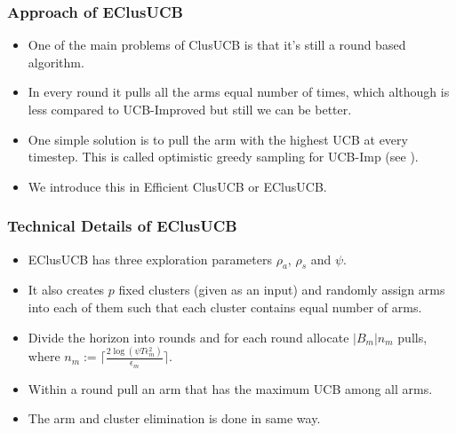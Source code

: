 \begin{frame}
\frametitle{Approach of EClusUCB}
\begin{itemize}
\item<1-> One of the main problems of ClusUCB is that it's still a round based algorithm.
\item<2-> In every round it pulls all the arms equal number of times, which although is less compared to UCB-Improved but still we can be better.
\item<3-> One simple solution is to pull the arm with the highest UCB at every timestep. This is called optimistic greedy sampling for UCB-Imp (see \cite{liu2016modification}).
\item<4-> We introduce this in Efficient ClusUCB or EClusUCB.
\end{itemize}
\end{frame}

\begin{frame}
\frametitle{Technical Details of EClusUCB}
\begin{itemize}
\item<1-> EClusUCB has three exploration parameters $\rho_a$, $\rho_s$ and $\psi$.
\item<2-> It also creates $p$ fixed clusters (given as an input) and randomly assign arms into each of them such that each cluster contains equal number of arms.
\item<3-> Divide the horizon into rounds and for each round allocate $|B_{m}|n_{m}$ pulls, where $n_{m}:=\bigg\lceil\frac{2\log{(\psi T\epsilon_{m}^{2})}}{\epsilon_{m}}\bigg\rceil$.
\item<4-> Within a round pull an arm that has the maximum UCB among all arms. 
\item<5-> The arm and cluster elimination is done in same way.
\end{itemize}
\end{frame}

